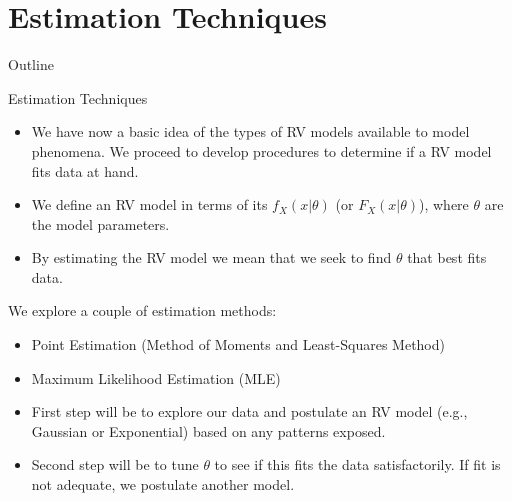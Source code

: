 \documentclass[9pt]{beamer}
\begin{document}
\section{Estimation Techniques}
\begin{frame}{Outline}
\tableofcontents[currentsection]
\end{frame}

%
\begin{frame}{Estimation Techniques}


\begin{itemize}
\setlength{\itemsep}{5pt}
\item We have now a basic idea of the types of RV models available to model phenomena. We proceed to develop procedures to determine if a RV model fits data at hand. 

\item We define an RV model in terms of its $f_X(x|\theta)$ (or $F_X(x|\theta)$), where $\theta$ are the model parameters. 

\item By estimating the RV model we mean that we seek to find $\theta$ that best fits data.

\end{itemize}

\begin{block}{}
We explore a couple of estimation methods:
\begin{itemize}
\item Point Estimation (Method of Moments and Least-Squares Method)

\item Maximum Likelihood Estimation (MLE)
\end{itemize}
\end{block}

\begin{itemize}
 \setlength{\itemsep}{5pt}
\item First step will be to explore our data and postulate an RV model (e.g., Gaussian or Exponential) based on any patterns exposed. 
\item Second step will be to tune $\theta$ to see if this fits the data satisfactorily. If fit is not adequate, we postulate another model.
\end{itemize}

\end{frame}
\end{document}

